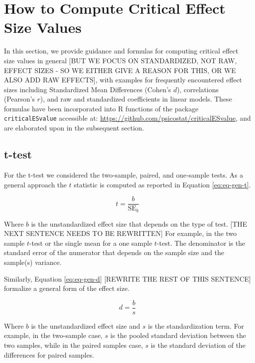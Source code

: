 \documentclass[
  man]{apa7}
\begin{document}
\hypertarget{how-to-compute-critical-effect-size-values}{%
\section{How to Compute Critical Effect Size Values}\label{how-to-compute-critical-effect-size-values}}

In this section, we provide guidance and formulas for computing critical effect size values in general {[}BUT WE FOCUS ON STANDARDIZED, NOT RAW, EFFECT SIZES - SO WE EITHER GIVE A REASON FOR THIS, OR WE ALSO ADD RAW EFFECTS{]}, with examples for frequently encountered effect sizes including Standardized Mean Differences (Cohen's \(d\)), correlations (Pearson's \(r\)), and raw and standardized coefficients in linear models. These formulas have been incorporated into R functions of the package \texttt{criticalESvalue} accessible at: \url{https://github.com/psicostat/criticalESvalue}, and are elaborated upon in the subsequent section.

\hypertarget{t-test}{%
\subsection{t-test}\label{t-test}}

For the t-test we considered the two-sample, paired, and one-sample tests. As a general approach the \(t\) statistic is computed as reported in Equation \eqref{eq:eq-gen-t}.

\begin{equation}
    \label{eq:eq-gen-t}
    t = \frac{b}{\text{SE}_{b}}
\end{equation}

Where \(b\) is the unstandardized effect size that depends on the type of test. {[}THE NEXT SENTENCE NEEDS TO BE REWRITTEN{]} For example, in the two sample \(t\)-test or the single mean for a one sample \(t\)-test. The denominator is the standard error of the numerator that depends on the sample size and the sample(s) variance.

Similarly, Equation \eqref{eq:eq-gen-d} {[}REWRITE THE REST OF THIS SENTENCE{]} formalize a general form of the effect size.

\begin{equation}
    \label{eq:eq-gen-d}
    d = \frac{b}{s}
\end{equation}

Where \(b\) is the unstandardized effect size and \(s\) is the standardization term. For example, in the two-sample case, \(s\) is the pooled standard deviation between the two samples, while in the paired samples case, \(s\) is the standard deviation of the differences for paired samples.
\end{document}
